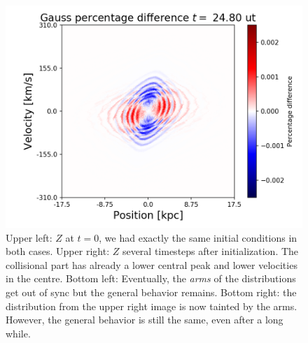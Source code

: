 \begin{figure}[h!]
    \includegraphics[scale=0.45]{imag/cGaussPhase62.png}
    \caption{Upper left: $Z$ at $t= 0$, we had exactly the same initial conditions in both cases. Upper right: $Z$ several timesteps after initialization. The collisional part has already a lower central peak and lower velocities in the centre. Bottom left: Eventually, the \emph{arms} of the distributions get out of sync but the general behavior remains. Bottom right: the distribution from the upper right image is now tainted by the arms. However, the general behavior is still the same, even after a long while.}
    \label{phaseColGauss}
\end{figure}

